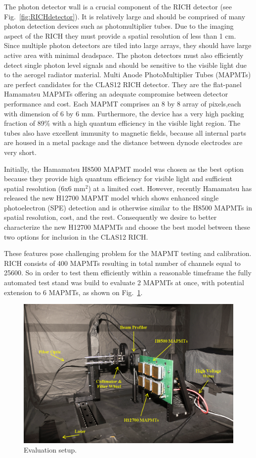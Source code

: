 \documentclass[5p,times,preprint]{elsarticle}
\begin{document}
The photon detector wall is a crucial component of the RICH detector (see Fig.~\ref{fig:RICHdetector}). It is relatively large and should be comprised of many photon detection devices such as photomultiplier tubes.
Due to the imaging aspect of the RICH they must provide a spatial resolution of less than 1 cm.
Since multiple photon detectors are tiled into large arrays, they should have large active area with minimal deadspace.
The photon detectors must also efficiently detect single photon level signals and should be sensitive to the visible light due to the aerogel radiator material.
Multi Anode PhotoMultiplier Tubes (MAPMTs) are perfect candidates for the CLAS12 RICH detector.
They are the flat-panel Hamamatsu MAPMTs offering an adequate compromise between detector performance and cost.
Each MAPMT comprises an 8 by 8 array of pixels,each with dimension of 6 by 6 mm.
Furthermore, the device has a very high packing fraction of 89\% with a high quantum efficiency in the visible light region.
The tubes also have excellent immunity to magnetic fields, because all internal parts are housed in a metal package and the distance between dynode electrodes are very short.


Initially, the Hamamatsu H8500 MAPMT model was chosen as the best option because they provide high quantum efficiency for visible light and sufficient spatial resolution (6x6 mm$^2$) at a limited cost.  However, recently Hamamatsu has released the new H12700 MAPMT model which shows enhanced single photoelectron (SPE) detection and is otherwise similar to the H8500 MAPMTs in spatial resolution, cost, and the rest.  Consequently we desire to better characterize the new H12700 MAPMTs and choose the best model between these two options for inclusion in the CLAS12 RICH.

These features pose challenging problem for the MAPMT testing and calibration.
RICH consists of 400 MAPMTs resulting in total number of channels equal to 25600. So in order to test them efficiently within a reasonable timeframe the fully automated test stand was build to evaluate 2 MAPMTs at once, with potential extension to 6 MAPMTs, as shown on Fig.~\ref{fig:MAPMTtest}.

\begin{figure}[hbt]
	\centering
	\includegraphics[width=0.9\linewidth]{blackbox.png}
	\caption{Evaluation setup.}
	\label{fig:MAPMTtest}
\end{figure}
\end{document}
